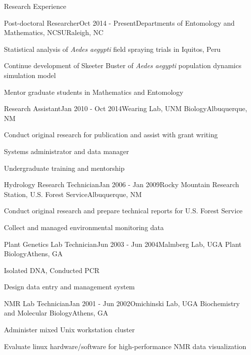 \documentclass{resume} %
\begin{document}
\begin{rSection}{Research Experience}

\begin{rSubsection}{Post-doctoral Researcher}{Oct 2014 - Present}{Departments of
Entomology and Mathematics, NCSU}{Raleigh, NC}
\item Statistical analysis of {\em Aedes aegypti} field spraying trials in Iquitos, Peru
\item Continue development of Skeeter Buster of {\em Aedes aegypti} population dynamics simulation model
\item Mentor graduate students in Mathematics and Entomology
\end{rSubsection}

\begin{rSubsection}{Research Assistant}{Jan 2010 - Oct 2014}{Wearing Lab, UNM Biology}{Albuquerque, NM}
\item Conduct original research for publication and assist with grant writing
\item Systems administrator and data manager
\item Undergraduate training and mentorship
\end{rSubsection}

\begin{rSubsection}{Hydrology Research Technician}{Jan 2006 - Jan 2009}{Rocky
Mountain Research Station, U.S. Forest Service}{Albuquerque, NM}
\item Conduct original research and prepare technical reports for U.S. Forest Service
\item Collect and managed environmental monitoring data 
\end{rSubsection}

\begin{rSubsection}{Plant Genetics Lab Technician}{Jun 2003 - Jun 2004}{Malmberg Lab, UGA Plant Biology}{Athens, GA}
\item Isolated DNA, Conducted PCR
\item Design data entry and management system
\end{rSubsection}

\begin{rSubsection}{NMR Lab Technician}{Jan 2001 - Jun 2002}{Omichinski Lab, UGA
Biochemistry and Molecular Biology}{Athens, GA}
\item Administer mixed Unix workstation cluster
\item Evaluate linux hardware/software for high-performance NMR data visualization
\end{rSubsection}
\end{rSection}
\end{document}
